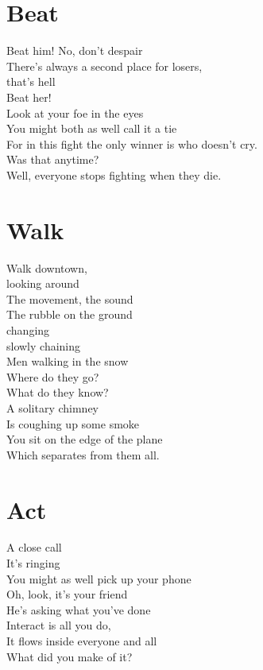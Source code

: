 \documentclass[a4paper,twoside, openany]{book}
\newenvironment{Verse}
  {\center\varwidth{\linewidth}\fontsize{18}{21.6}\selectfont}
  {\endvarwidth\endcenter}
\begin{document}
\chapter{Beat}
\begin{Verse}
    Beat him!
    No, don’t despair\\ 
    There’s always a second place for losers,\\
    that’s hell\\
    Beat her!\\
    Look at your foe in the eyes\\
    You might both as well call it a tie\\
    For in this fight the only winner is who doesn't cry.\\
    Was that anytime?\\
    Well, everyone stops fighting when they die.
\end{Verse}

\chapter{Walk}
\begin{Verse}
    Walk downtown,\\
    looking around\\
    The movement, the sound\\
    The rubble on the ground\\
    changing\\
    slowly chaining\\
    Men walking in the snow\\
    Where do they go?\\
    What do they know?\\
    A solitary chimney\\
    Is coughing up some smoke\\
    You sit on the edge of the plane\\
    Which separates from them all.
\end{Verse}

\chapter{Act}
\begin{Verse}
    A close call\\
    It’s ringing\\
    You might as well pick up your phone\\
    Oh, look, it’s your friend\\
    He’s asking what you’ve done\\
    Interact is all you do,\\
    It flows inside everyone and all\\
    What did you make of it?
\end{Verse}
\end{document}
